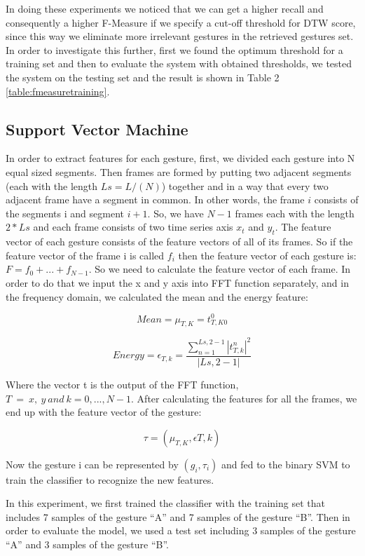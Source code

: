 \documentclass[twoside,10pt,a4paper]{article}
\begin{document}
In doing these experiments we noticed that we can get a higher recall
and consequently a higher F-Measure if we specify a cut-off threshold
for DTW score, since this way we eliminate more irrelevant gestures in
the retrieved gestures set. In order to investigate this further,
first we found the optimum threshold for a training set and then to
evaluate the system with obtained thresholds, we tested the system on
the testing set and the result is shown in Table 2
\ref{table:fmeasuretraining}.


\subsection{Support Vector Machine}

In order to extract features for each gesture, first, we divided each
gesture into N equal sized segments.  Then frames are formed by
putting two adjacent segments (each with the length $Ls = L/(N)$)
together and in a way that every two adjacent frame have a segment in
common. In other words, the frame $i$ consists of the segments i and
segment $i + 1$. So, we have $N -1$ frames each with the length $2*Ls$
and each frame consists of two time series axis $x_t$ and $y_t$. The
feature vector of each gesture consists of the feature vectors of all of
its frames. So if the feature vector of the frame i is called $f_i$ then
the feature vector of each gesture is: $F=f_0+ ...+ f_{N-1}$.  So we need
to calculate the feature vector of each frame. In order to do that we
input the x and y axis into FFT function separately, and in the
frequency domain, we calculated the mean and the energy feature:

\[ Mean =\mu_{T,K} = t_{T,K0}^0 \]

\[ Energy = \epsilon_{T,k} = \frac{\sum_{n=1}^{Ls,2-1}|t_{T,k}^n|^2}{|Ls,2-1|} \]

Where the vector t is the output of the FFT function, $T\ =\ x,\ y\ and\ k
=0,...,N-1$.  After calculating the features for all the frames, we
end up with the feature vector of the gesture:

\[ \tau = ( \mu_{T,K},\epsilon{T,k}) \]

Now the gesture i can be represented by $(g_i , \tau_i)$ and fed to the
binary SVM to train the classifier to recognize the new features.

In this experiment, we first trained the classifier with the training
set that includes 7 samples of the gesture ``A'' and 7 samples of the
gesture ``B''. Then in order to evaluate the model, we used a test set
including 3 samples of the gesture ``A'' and 3 samples of the gesture
``B''.
\end{document}
